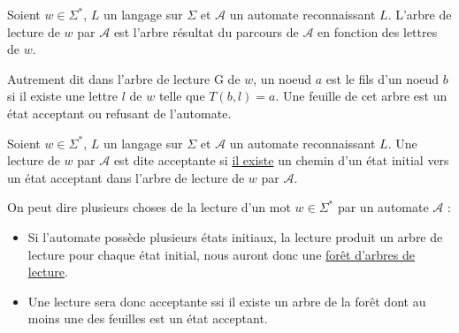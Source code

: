 \begin{definition}
    Soient $w \in \Sigma^*$, $L$ un langage sur $\Sigma$ et $ \mathcal{A}$ un automate reconnaissant $L$.
    L'arbre de lecture de $w$ par $ \mathcal{A}$ est l'arbre résultat du parcours de $ \mathcal{A}$ en fonction 
    des lettres de $w$. 
    
    Autrement dit dans l'arbre de lecture G de $w$, un noeud $a$ est le fils d'un 
    noeud $b$ si il existe une lettre $l$ de $w$ telle que $T(b,l) = a$. Une feuille de cet arbre est un état acceptant 
    ou refusant de l'automate. 
\end{definition}

\begin{definition}
    Soient $w \in \Sigma^*$, $L$ un langage sur $\Sigma$ et $ \mathcal{A}$ un automate reconnaissant $L$. 
    Une lecture de $w$ par $ \mathcal{A}$ est dite acceptante si \underline{il existe} un chemin 
    d'un état initial vers un état acceptant dans l'arbre de lecture de $w$ par $ \mathcal{A}$. 
\end{definition}

\begin{proposition}
    On peut dire plusieurs choses de la lecture d'un mot $w \in \Sigma^*$ par un automate $ \mathcal{A}$ :
    \begin{itemize}
        \item Si l'automate possède plusieurs états initiaux, la lecture produit un arbre de lecture pour chaque 
        état initial, nous auront donc une \underline{forêt d'arbres de lecture}. 
        \item Une lecture sera donc acceptante ssi il existe un arbre de la forêt dont au moins une des feuilles
        est un état acceptant. 
    \end{itemize}
\end{proposition}

